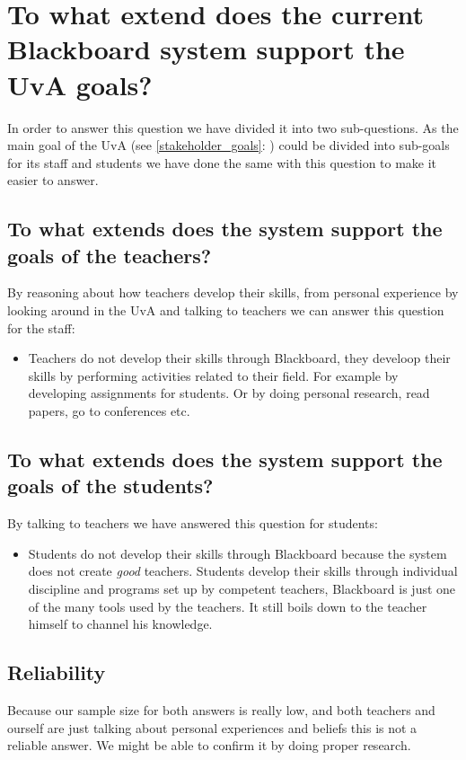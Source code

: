 \section{To what extend does the current Blackboard system support the UvA goals?} \label{uva_goal_question}
In order to answer this question we have divided it into two sub-questions. As the main goal of the UvA (see \ref{stakeholder_goals}: ) could be divided into sub-goals for its staff and students we have done the same with this question to make it easier to answer.

\subsection{To what extends does the system support the goals of the teachers?}
By reasoning about how teachers develop their skills, from personal experience by looking around in the UvA and talking to teachers we can answer this question for the staff:
\begin{itemize}
	\item Teachers do not develop their skills through Blackboard, they develoop their skills by performing activities related to their field. For example by developing assignments for students. Or by doing personal research, read papers, go to conferences etc.
\end{itemize}

\subsection{To what extends does the system support the goals of the students?}
By talking to teachers we have answered this question for students:
\begin{itemize}
	\item Students do not develop their skills through Blackboard because the system does not create \emph{good} teachers. Students develop their skills through individual discipline and programs set up by competent teachers, Blackboard is just one of the many tools used by the teachers. It still boils down to the teacher himself to channel his knowledge.
\end{itemize}

\subsection{Reliability}
Because our sample size for both answers is really low, and both teachers and ourself are just talking about personal experiences and beliefs this is not a reliable answer. We might be able to confirm it by doing proper research. 

